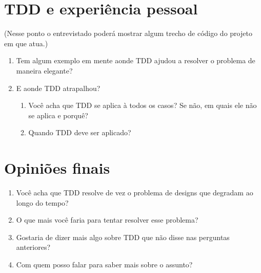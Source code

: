 \section{TDD e experiência pessoal}

(Nesse ponto o entrevistado poderá mostrar algum trecho de código do projeto em que atua.)

\begin{enumerate}
	\item Tem algum exemplo em mente aonde TDD ajudou a resolver o problema de
	maneira elegante?

	\item E aonde TDD atrapalhou?
		\begin{enumerate}
			\item Você acha que TDD se aplica à todos os casos? Se não, em quais ele não 
			se aplica e porquê?

			\item Quando TDD deve ser aplicado?
		\end{enumerate}

\end{enumerate}

\section{Opiniões finais}

\begin{enumerate}
	\item Você acha que TDD resolve de vez o problema de designs que degradam ao longo do tempo?

	\item O que mais você faria para tentar resolver esse problema?

	\item Gostaria de dizer mais algo sobre TDD que não disse nas perguntas anteriores?

	\item Com quem posso falar para saber mais sobre o assunto?
\end{enumerate}

